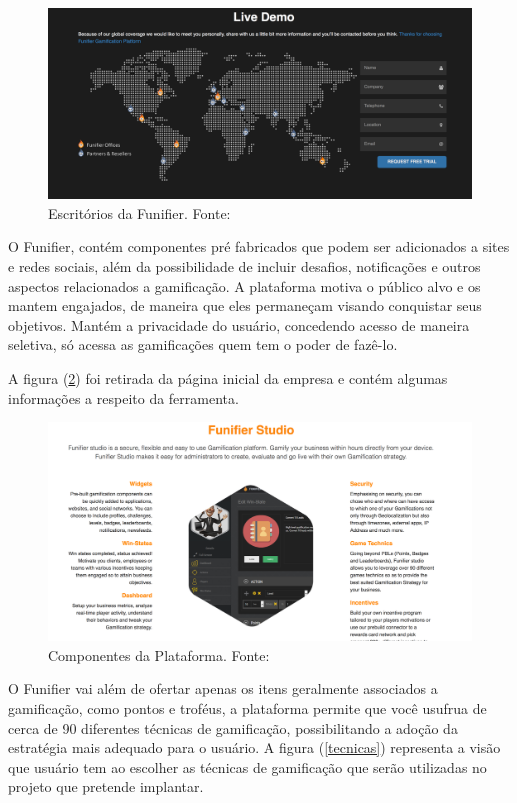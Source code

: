 \begin{figure}[h]
	\centering
		\includegraphics[keepaspectratio=true,scale=0.3]{figuras/globalfig.png}
	\caption{Escritórios da Funifier. Fonte: \cite{funifier}\label{globalfig}
}
\end{figure}


O Funifier, contém componentes pré fabricados que podem ser adicionados a sites e redes sociais, além da possibilidade de incluir desafios, notificações e outros aspectos relacionados a gamificação. A plataforma motiva o público alvo e os mantem engajados, de maneira que eles permaneçam visando conquistar seus objetivos. Mantém a privacidade do usuário, concedendo acesso de maneira seletiva, só acessa as gamificações quem tem o poder de fazê-lo. 

\newpage 
A figura (\ref{funifier}) foi retirada da página inicial da empresa e contém algumas informações a respeito da ferramenta.


\begin{figure}[h]
	\centering
		\includegraphics[keepaspectratio=true,scale=0.3]{figuras/funifier.png}
	\caption{Componentes da Plataforma. Fonte: \cite{funifier}\label{funifier}
}
\end{figure}


O Funifier vai além de ofertar apenas os itens geralmente associados a gamificação, como pontos e troféus, a plataforma permite que você usufrua de cerca de 90 diferentes técnicas de gamificação, possibilitando a adoção da estratégia mais adequado para o usuário. A figura (\ref{tecnicas}) representa a visão que usuário tem ao escolher as técnicas de gamificação que serão utilizadas no projeto que pretende implantar.



